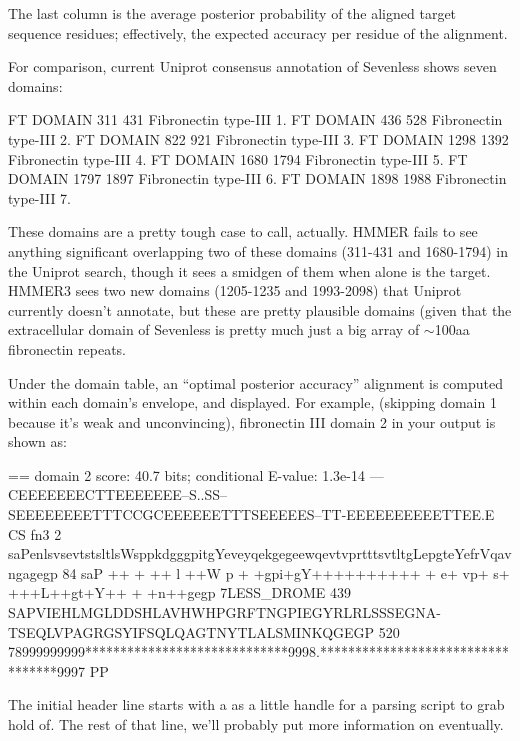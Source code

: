 The last column is the average posterior probability of the aligned
target sequence residues; effectively, the expected accuracy per
residue of the alignment.

For comparison, current Uniprot consensus annotation of Sevenless
shows seven domains:

\begin{sreoutput}
FT   DOMAIN      311    431       Fibronectin type-III 1.
FT   DOMAIN      436    528       Fibronectin type-III 2.
FT   DOMAIN      822    921       Fibronectin type-III 3.
FT   DOMAIN     1298   1392       Fibronectin type-III 4.
FT   DOMAIN     1680   1794       Fibronectin type-III 5.
FT   DOMAIN     1797   1897       Fibronectin type-III 6.
FT   DOMAIN     1898   1988       Fibronectin type-III 7.
\end{sreoutput}

These domains are a pretty tough case to call, actually. HMMER fails
to see anything significant overlapping two of these domains (311-431
and 1680-1794) in the Uniprot search, though it sees a smidgen of them
when  alone is the target. HMMER3 sees two new
domains (1205-1235 and 1993-2098) that Uniprot currently doesn't
annotate, but these are pretty plausible domains (given that the
extracellular domain of Sevenless is pretty much just a big array of
$\sim$100aa fibronectin repeats.

Under the domain table, an ``optimal posterior accuracy'' alignment
\citep{Holmes98} is computed within each domain's envelope, and
displayed. For example, (skipping domain 1 because it's weak and
unconvincing), fibronectin III domain 2 in your 
output is shown as:

\begin{sreoutput}
 == domain 2    score: 40.7 bits;  conditional E-value: 1.3e-14
                  ---CEEEEEEECTTEEEEEEE--S..SS--SEEEEEEEETTTCCGCEEEEEETTTSEEEEES--TT-EEEEEEEEEETTEE.E CS
          fn3   2 saPenlsvsevtstsltlsWsppkdgggpitgYeveyqekgegeewqevtvprtttsvtltgLepgteYefrVqavngagegp 84 
                  saP   ++ +  ++ l ++W p +  +gpi+gY++++++++++  + e+ vp+   s+ +++L++gt+Y++ +  +n++gegp
  7LESS_DROME 439 SAPVIEHLMGLDDSHLAVHWHPGRFTNGPIEGYRLRLSSSEGNA-TSEQLVPAGRGSYIFSQLQAGTNYTLALSMINKQGEGP 520
                  78999999999*****************************9998.**********************************9997 PP
\end{sreoutput}

The initial header line starts with a \prog{==} as a little handle for
a parsing script to grab hold of. The rest of that line, we'll
probably put more information on eventually.

